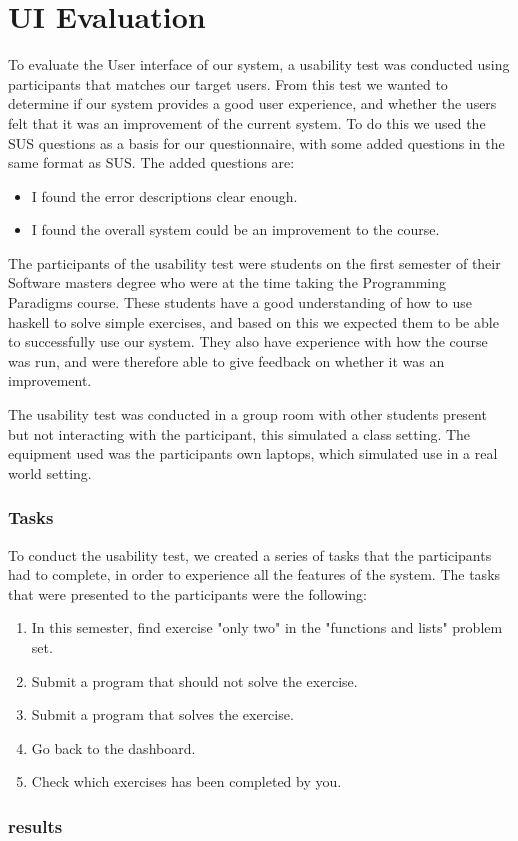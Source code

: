 \chapter{UI Evaluation} \label{chap:Evaluation}
To evaluate the User interface of our system, a usability test was conducted using participants that matches our target users. From this test we wanted to determine if our system provides a good user experience, and whether the users felt that it was an improvement of the current system.
To do this we used the SUS questions as a basis for our questionnaire, with some added questions in the same format as SUS. The added questions are:
\begin{itemize}
    \item I found the error descriptions clear enough.
    \item I found the overall system could be an improvement to the course.
\end{itemize}
The participants of the usability test were students on the first semester of their Software masters degree who were at the time taking the Programming Paradigms course. 
These students have a good understanding of how to use haskell to solve simple exercises, and based on this we expected them to be able to successfully use our system. They also have experience with how the course was run, and were therefore able to give feedback on whether it was an improvement.

The usability test was conducted in a group room with other students present but not interacting with the participant, this simulated a class setting. 
The equipment used was the participants own laptops, which simulated use in a real world setting.

\subsection*{Tasks}
To conduct the usability test, we created a series of tasks that the participants had to complete, in order to experience all the features of the system.
The tasks that were presented to the participants were the following:
\begin{enumerate}
    \item In this semester, find exercise "only two" in the "functions and lists" problem set.
    \item Submit a program that should not solve the exercise.
    \item Submit a program that solves the exercise.
    \item Go back to the dashboard.
    \item Check which exercises has been completed by you.
\end{enumerate}



\subsection*{results}